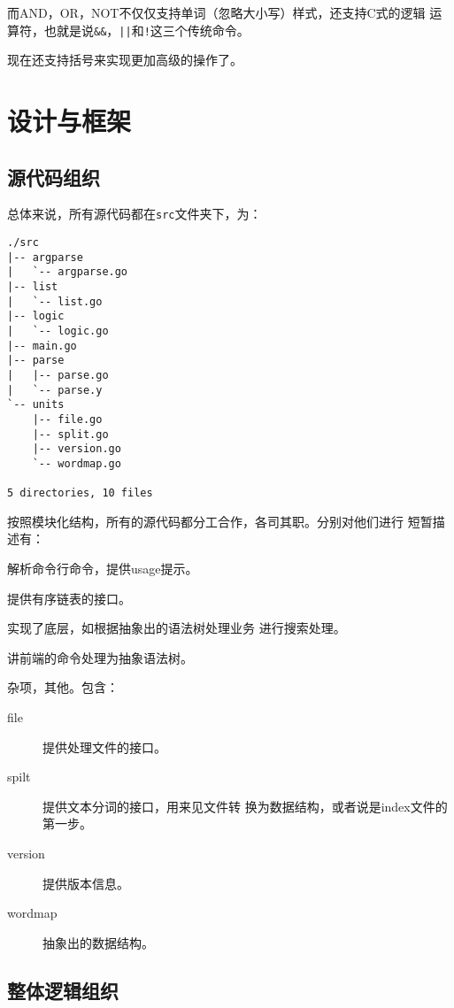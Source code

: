 \documentclass{peterlitsdoc}
\begin{document}
而AND，OR，NOT不仅仅支持单词（忽略大小写）样式，还支持C式的逻辑
运算符，也就是说\verb|&&|，\verb-||-和\verb|!|这三个传统命令。

现在还支持括号来实现更加高级的操作了。


\section{设计与框架}

\subsection{源代码组织}

总体来说，所有源代码都在\verb|src|文件夹下，为：
\begin{lstlisting}
./src
|-- argparse
|   `-- argparse.go
|-- list
|   `-- list.go
|-- logic
|   `-- logic.go
|-- main.go
|-- parse
|   |-- parse.go
|   `-- parse.y
`-- units
    |-- file.go
    |-- split.go
    |-- version.go
    `-- wordmap.go

5 directories, 10 files
\end{lstlisting}

按照模块化结构，所有的源代码都分工合作，各司其职。分别对他们进行
短暂描述有：

\begin{description}[labelindent=\parindent]
    \item[argparse] 解析命令行命令，提供usage提示。
    \item[list] 提供有序链表的接口。
    \item[logic] 实现了底层，如根据抽象出的语法树处理业务
        进行搜索处理。
    \item[parse] 讲前端的命令处理为抽象语法树。
    \item[units] 杂项，其他。包含：
        \begin{description}
            \item[file] 提供处理文件的接口。
            \item[spilt] 提供文本分词的接口，用来见文件转
                换为数据结构，或者说是index文件的第一步。
            \item[version] 提供版本信息。
            \item[wordmap] 抽象出的数据结构。
        \end{description}
\end{description}

\subsection{整体逻辑组织}
\end{document}
